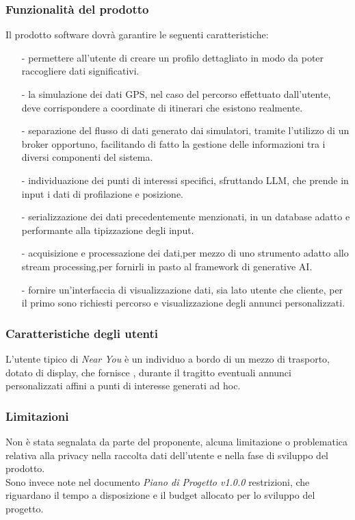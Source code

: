 \documentclass[11pt]{article}
\begin{document}
\begin{justify}
\subsubsection{Funzionalità del prodotto}
Il prodotto software dovrà garantire le seguenti caratteristiche:
\begin{itemize}
    \item [-] permettere all'utente di creare un profilo dettagliato in modo da poter raccogliere dati significativi.
    \item [-] la simulazione dei dati GPS, nel caso del percorso effettuato dall'utente, deve corrispondere a coordinate di itinerari che esistono realmente.
    \item [-] separazione del flusso di dati generato dai simulatori, tramite l'utilizzo di un broker opportuno, facilitando di fatto la gestione delle informazioni tra i diversi componenti del sistema.
    \item [-] individuazione dei punti di interessi specifici, sfruttando LLM, che prende in input i dati di profilazione e posizione.
    \item [-] serializzazione dei dati precedentemente menzionati, in un database adatto e performante alla tipizzazione degli input.
    \item [-] acquisizione e processazione dei dati,per mezzo di uno strumento adatto allo stream processing,per fornirli in pasto al framework di generative AI.
    \item [-] fornire un'interfaccia di visualizzazione dati, sia lato utente che cliente, per il primo sono richiesti percorso e visualizzazione degli annunci personalizzati.
    
\end{itemize}

\subsubsection{Caratteristiche degli utenti}
L'utente tipico di \textit{Near You} è un individuo a bordo di un mezzo di trasporto, dotato di display, che fornisce , durante il tragitto eventuali annunci personalizzati affini a punti di interesse generati ad hoc.
\subsubsection{Limitazioni}
Non è stata segnalata da parte del proponente, alcuna limitazione o problematica relativa alla privacy nella raccolta dati dell'utente e nella fase di sviluppo del prodotto.
\\
Sono invece note nel documento \textit{Piano di Progetto v1.0.0} restrizioni, che riguardano il tempo a disposizione e il budget allocato per lo sviluppo del progetto. 
\newpage

\end{justify}
\end{document}
